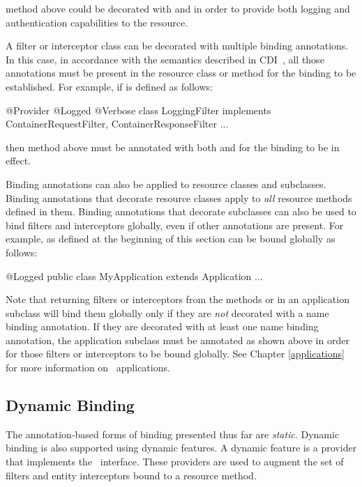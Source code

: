 method  above could be decorated with  and  in order to provide both logging and authentication capabilities to the resource.

A filter or interceptor class can be decorated with multiple binding annotations. In this case, in accordance with the semantics described in CDI~\cite{jsr299}, all those annotations must be present in the resource class or method for the binding to be established. For example, if  is defined as follows:

\begin{listing}{1}
@Provider
@Logged @Verbose
class LoggingFilter implements ContainerRequestFilter, 
                               ContainerResponseFilter {
    ...
}
\end{listing}

then method  above must be annotated with both  and  for the binding to be in effect.

Binding annotations can also be applied to resource classes and   subclasses. Binding annotations that decorate resource classes apply to \emph{all} resource methods defined in them. 
Binding annotations that decorate  subclasses can also be used to bind filters and interceptors globally, even if other annotations are present. For example,  as defined at the beginning of this section can be bound globally as follows:

\begin{listing}{1}
@Logged
public class MyApplication extends Application {
    ...
}
\end{listing}

Note that returning filters or interceptors from the methods  or  in an application subclass will bind them globally only if they are \emph{not} decorated with a name binding annotation. If they are decorated with at least one name binding annotation, the application subclass must be annotated as shown above in order for those filters or interceptors to be bound globally. See Chapter \ref{applications} for more information on \jaxrs\ applications.

\subsection{Dynamic Binding}
\label{dynamic_binding}

The annotation-based forms of binding presented thus far are {\em static}. Dynamic binding is also supported using dynamic features. A dynamic feature is a provider that implements the \DynamicFeature\ interface. These providers are used to augment the set of filters and entity interceptors bound to a resource method. 

